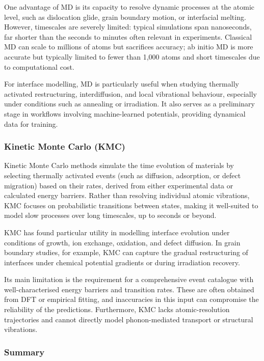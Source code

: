 
One advantage of MD is its capacity to resolve dynamic processes at the atomic level, such as dislocation glide,
grain boundary motion, or interfacial melting. However, timescales are severely limited: typical simulations span
nanoseconds, far shorter than the seconds to minutes often relevant in experiments. Classical MD can scale to
millions of atoms but sacrifices accuracy; ab initio MD is more accurate but typically limited to fewer than 1,000
atoms and short timescales due to computational cost.


For interface modelling, MD is particularly useful when studying thermally activated restructuring, interdiffusion,
and local vibrational behaviour, especially under conditions such as annealing or irradiation. It also serves as a
preliminary stage in workflows involving machine-learned potentials, providing dynamical data for training.

\subsubsection{Kinetic Monte Carlo (KMC)}

Kinetic Monte Carlo methods simulate the time evolution of materials by selecting thermally activated events (such
as diffusion, adsorption, or defect migration) based on their rates, derived from either experimental data or
calculated energy barriers. Rather than resolving individual atomic vibrations, KMC focuses on probabilistic
transitions between states, making it well-suited to model slow processes over long timescales, up to seconds or beyond.

KMC has found particular utility in modelling interface evolution under conditions of growth, ion exchange,
oxidation, and defect diffusion. In grain boundary studies, for example, KMC can capture the gradual restructuring
of interfaces under chemical potential gradients or during irradiation recovery.

Its main limitation is the requirement for a comprehensive event catalogue with well-characterised energy barriers
and transition rates. These are often obtained from DFT or empirical fitting, and inaccuracies in this input can
compromise the reliability of the predictions. Furthermore, KMC lacks atomic-resolution trajectories and cannot
directly model phonon-mediated transport or structural vibrations.

\subsubsection{Summary}

